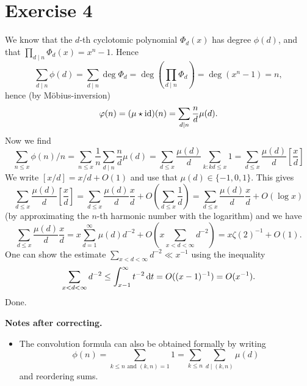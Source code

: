 \documentclass[a4paper,11pt]{article}
\begin{document}
\section*{Exercise 4}
We know that the $d$-th cyclotomic polynomial $\Phi_d(x)$ has degree $\phi(d)$, and that 
$\prod_{d \mid n} \Phi_d(x) = x^n - 1$. Hence 
\[
\sum_{d \mid n} \phi(d) = \sum_{d \mid n } \deg \Phi_d = \deg \left(\prod_{d
\mid n} \Phi_d \right) = \deg(x^n - 1) = n,
\]
hence (by Möbius-inversion)
\[
    \varphi(n) = (\mu \star \operatorname{id})(n) = \sum_{d\mid n}\frac nd \mu(d). 
\]
Now we find 
\[
    \sum_{n \leq x} \phi(n) / n = \sum_{n \leq x} \frac 1n \sum_{d \mid n}
    \frac nd \mu(d) = \sum_{d \leq x} \frac{\mu(d)}d \sum_{k : kd \leq x} 1 = 
    \sum_{d \leq x} \frac{\mu(d)}d \left[\frac xd \right] 
\]
We write $[x/d] = x/d + O(1)$ and use that $\mu(d) \in \{-1, 0, 1\}$. This gives 
\[
    \sum_{d \leq x} \frac{\mu(d)}d \left[\frac xd \right] 
    = \sum_{d \leq x} \frac{\mu(d)}d \frac xd + O\left(\sum_{d \leq x} \frac 1d \right) 
    = \sum_{d \leq x} \frac{\mu(d)}d \frac xd + O(\log x)
\]
(by approximating the $n$-th harmonic number with the logarithm) and 
we have 
\[
    \sum_{d \leq x} \frac{\mu(d)}d \frac xd = x \sum_{d = 1}^\infty \mu(d) d^{-2} + 
    O \left(x \sum_{x < d < \infty} d^{-2} \right) = x \zeta(2)^{-1} + O(1).
\]
One can show the estimate $\sum_{x < d < \infty} d^{-2} \ll x^{-1}$ using the inequality
\[
    \sum_{x < d < \infty} d^{-2} \leq \int_{x-1}^\infty t^{-2} \mathrm{\,d} t = O((x-1)^{-1}) = O(x^{-1}).
\]
Done. 



\textbf{Notes after correcting.} \leavevmode
\begin{itemize}
    \item The convolution formula can also be obtained formally by writing
        \[
            \phi(n) = \sum_{k \leq n \text{ and } (k,n) = 1} 1 = \sum_{k \leq
            n} \sum_{d \mid (k,n)} \mu(d)
        \]
        and reordering sums.
\end{itemize}
\end{document}
